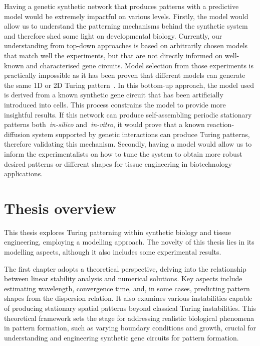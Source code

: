 Having a genetic synthetic network that produces patterns with a predictive model would be extremely impactful on various levels.
Firstly, the model would allow us to understand the patterning mechanisms behind the synthetic system and therefore shed some light on developmental biology.
Currently, our understanding from top-down approaches is based on arbitrarily chosen models that match well the experiments, but that are not directly informed on well-known and characterised gene circuits.
Model selection from those experiments is practically impossible as it has been proven that different models can generate the same 1D or 2D Turing pattern~\parencite{Woolley2021}.
In this bottom-up approach, the model used is derived from a known synthetic gene circuit that has been artificially introduced into cells.
This process constrains the model to provide more insightful results.
If this network can produce self-assembling periodic stationary patterns both~\textit{in-silico} and~\textit{in-vitro}, it would prove that a known reaction-diffusion system supported by genetic interactions can produce Turing patterns, therefore validating this mechanism.
Secondly, having a model would allow us to inform the experimentalists on how to tune the system to obtain more robust desired patterns or different shapes for tissue engineering in biotechnology applications.


\section{Thesis overview}


This thesis explores Turing patterning within synthetic biology and tissue engineering, employing a modelling approach.
The novelty of this thesis lies in its modelling aspects, although it also includes some experimental results.

The first chapter adopts a theoretical perspective, delving into the relationship between linear stability analysis and numerical solutions.
Key aspects include estimating wavelength, convergence time, and, in some cases, predicting pattern shapes from the dispersion relation.
It also examines various instabilities capable of producing stationary spatial patterns beyond classical Turing instabilities.
This theoretical framework sets the stage for addressing realistic biological phenomena in pattern formation, such as varying boundary conditions and growth, crucial for understanding and engineering synthetic gene circuits for pattern formation.

